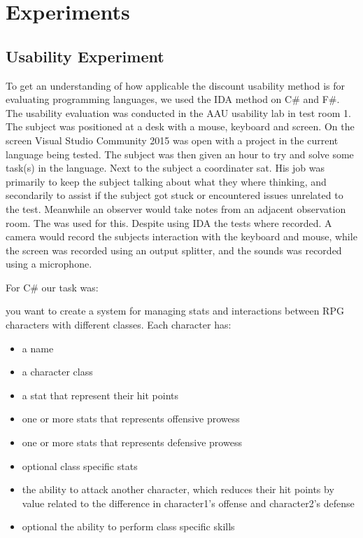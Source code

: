 \chapter{Experiments}
\section{Usability Experiment}
To get an understanding of how applicable the discount usability method is for evaluating programming languages, we used the IDA method on C\# and F\#.
The usability evaluation was conducted in the AAU usability lab  in test room 1.
The subject was positioned at a desk with a mouse, keyboard and screen.
On the screen Visual Studio Community 2015 was open with a project in the current language being tested.
The subject was then given an hour to try and solve some task(s) in the language.
Next to the subject a coordinater sat.
His job was primarily to keep the subject talking about what they where thinking, and secondarily to assist if the subject got stuck or encountered issues unrelated to the test.
Meanwhile an observer would take notes from an adjacent observation room.
The  was used for this.
Despite using IDA the tests where recorded.
A camera would record the subjects interaction with the keyboard and mouse, while the screen was recorded using an output splitter, and the sounds was recorded using a microphone.

For C\# our task was:

you want to create a system for managing stats and interactions between RPG characters with different classes.
Each character has:
\begin{itemize}
\item a name
\item a character class
\item a stat that represent their hit points
\item one or more stats that represents offensive prowess
\item one or more stats that represents defensive prowess
\item optional class specific stats
\item the ability to attack another character, which reduces their hit points by value related to the difference in character1's offense and character2's defense
\item optional the ability to perform class specific skills
\end{itemize}

